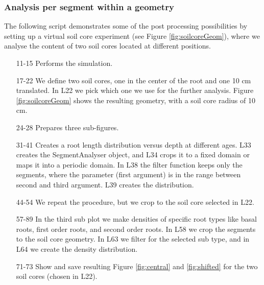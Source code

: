 \subsubsection*{Analysis per segment within a geometry}

The following script demonstrates some of the post processing possibilities by setting up a virtual soil core experiment (see Figure \ref{fig:soilcoreGeom}), where we analyse the content of two soil cores located at different positions.



\begin{itemize}

\item[11-15] Performs the simulation.

\item[17-22] We define two soil cores, one in the center of the root and one 10 cm translated. In L22 we pick which one we use for the further analysis. Figure \ref{fig:soilcoreGeom} shows the resulting geometry, with a soil core radius of 10 cm.

\item[24-28] Prepares three sub-figures. 

\item[31-41] Creates a root length distribution versus depth at different ages. L33 creates the SegmentAnalyser object, and L34 crops it to a fixed domain or maps it into a periodic domain. In L38 the filter function keeps only the segments, where the parameter (first argument) is in the range between second and third argument. L39 creates the distribution. 

\item[44-54] We repeat the procedure, but we crop to the soil core selected in L22. 

\item[57-89] In the third sub plot we make densities of specific root types like basal roots, first order roots, and second order roots. In L58 we crop the segments to the soil core geometry. In L63 we filter for the selected sub type, and in L64 we create the density distribution.

\item[71-73] Show and save resulting Figure \ref{fig:central} and \ref{fig:shifted} for the two soil cores (chosen in L22).

\end{itemize}


